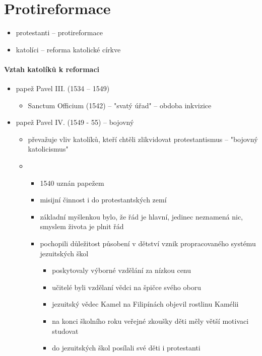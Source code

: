 \section{Protireformace}
\begin{itemize}
\item protestanti -- protireformace
\item katolíci -- reforma katolické církve
\end{itemize}

\paragraph{Vztah katolíků k reformaci}
\begin{itemize}
\item papež Pavel III. (1534 -- 1549)
	\begin{itemize}
	\item Sanctum Officium (1542) -- "svatý úřad" -- obdoba inkvizice
	\end{itemize}
\item papež Pavel IV. (1549 - 55) -- bojovný
	\begin{itemize}
	\item převažuje vliv katolíků, kteří chtěli zlikvidovat protestantismus -- "bojovný katolicismus"
	\item{}
		\begin{itemize}
		\item 1540 uznán papežem
		\item misijní činnost i do protestantských zemí
		\item základní myšlenkou bylo, že řád je hlavní, jedinec neznamená nic, smyslem života je plnit řád
		\item pochopili důležitost působení v dětství \ra vznik propracovaného systému jezuitských škol
			\begin{itemize}
			\item poskytovaly výborné vzdělání za nízkou cenu
			\item učitelé byli vzdělaní vědci na špičce svého oboru
			\item jezuitský vědec Kamel \ra na Filipínách objevil rostlinu Kamélii
			\item na konci školního roku veřejné zkoušky \ra děti měly větší motivaci studovat
			\item do jezuitských škol posílali své děti i protestanti
			\end{itemize}
		\end{itemize}
	\end{itemize}
\end{itemize}

